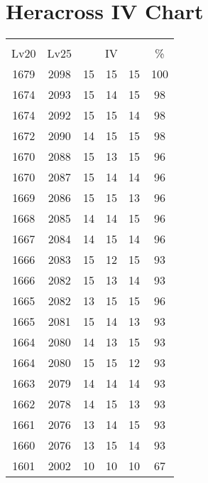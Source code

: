 \documentclass{article}%
\begin{document}
%
\normalsize%
\section{Heracross IV Chart}%
\label{sec:Heracross IV Chart}%
\renewcommand{\arraystretch}{1.5}%
\begin{tabular}{|c|c|c|c|c|c|}%
\hline%
\multicolumn{6}{|c|}{\textcolor{white}{ 
\linebreak{Heracross}
}%
\cellcolor{black}}\\%
\multicolumn{1}{|c}{Lv20}&\multicolumn{1}{c|}{Lv25}&\multicolumn{3}{c|}{IV}&\multicolumn{1}{|c|}{\%}\\%
\hline%
\rowcolor{color100}%
1679&2098&15&15&15&100\\%
\hline%
\rowcolor{color98}%
1674&2093&15&14&15&98\\%
\hline%
\rowcolor{color98}%
1674&2092&15&15&14&98\\%
\hline%
\rowcolor{color98}%
1672&2090&14&15&15&98\\%
\hline%
\rowcolor{color96}%
1670&2088&15&13&15&96\\%
\hline%
\rowcolor{color96}%
1670&2087&15&14&14&96\\%
\hline%
\rowcolor{color96}%
1669&2086&15&15&13&96\\%
\hline%
\rowcolor{color96}%
1668&2085&14&14&15&96\\%
\hline%
\rowcolor{color96}%
1667&2084&14&15&14&96\\%
\hline%
\rowcolor{color93}%
1666&2083&15&12&15&93\\%
\hline%
\rowcolor{color93}%
1666&2082&15&13&14&93\\%
\hline%
\rowcolor{color96}%
1665&2082&13&15&15&96\\%
\hline%
\rowcolor{color93}%
1665&2081&15&14&13&93\\%
\hline%
\rowcolor{color93}%
1664&2080&14&13&15&93\\%
\hline%
\rowcolor{color93}%
1664&2080&15&15&12&93\\%
\hline%
\rowcolor{color93}%
1663&2079&14&14&14&93\\%
\hline%
\rowcolor{color93}%
1662&2078&14&15&13&93\\%
\hline%
\rowcolor{color93}%
1661&2076&13&14&15&93\\%
\hline%
\rowcolor{color93}%
1660&2076&13&15&14&93\\%
\hline%
\rowcolor{color91}%
1601&2002&10&10&10&67\\%
\end{tabular}

%
\end{document}
